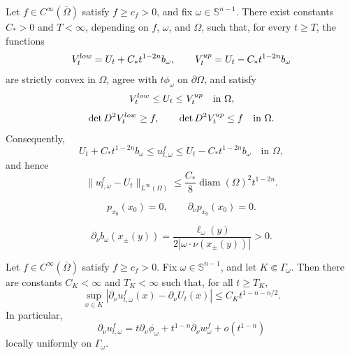 \documentclass[10pt,a4paper]{amsart}
\newcommand{\Sn}{\mathbb S^{n-1}}
\begin{document}
\begin{proposition}\label{prop:comparison-barriers}
Let \(f\in C^\infty(\overline\Omega)\) satisfy \(f\ge c_f>0\), and fix \(\omega\in\Sn\).  There exist constants \(C_*>0\) and \(T<\infty\), depending on \(f\), \(\omega\), and \(\Omega\), such that, for every \(t\ge T\), the functions
\begin{equation}\label{eq:lower-upper-barriers}
    V_t^{\rm low}
    =U_t+C_*t^{1-2n}b_\omega,
    \qquad
    V_t^{\rm up}
    =U_t-C_*t^{1-2n}b_\omega
\end{equation}
are strictly convex in \(\Omega\), agree with \(t\phi_\omega\) on \(\partial\Omega\), and satisfy
\begin{equation}\label{eq:barrier-order-around-U}
    V_t^{\rm low}\le U_t\le V_t^{\rm up}
    \quad\text{in }\Omega,
\end{equation}
\begin{equation}\label{eq:barrier-det-inequalities}
    \det D^2V_t^{\rm low}\ge f,
    \qquad
    \det D^2V_t^{\rm up}\le f
    \quad\text{in }\Omega .
\end{equation}
Consequently,
\begin{equation}\label{eq:global-C0-asymptotic}
    U_t+C_*t^{1-2n}b_\omega
    \le
    u_{t,\omega}^f
    \le
    U_t-C_*t^{1-2n}b_\omega
    \quad\text{in }\Omega,
\end{equation}
and hence
\begin{equation}\label{eq:global-C0-asymptotic-bound}
    \|u_{t,\omega}^f-U_t\|_{L^\infty(\Omega)}
    \le
    \frac{C_*}{8}\operatorname{diam}(\Omega)^2 t^{1-2n}.
\end{equation}
\end{proposition}

\begin{equation}\label{eq:p-x0-normal-zero}
    p_{x_0}(x_0)=0,
    \qquad
    \partial_\nu p_{x_0}(x_0)=0.
\end{equation}

\begin{equation}\label{eq:b-normal-step8}
    \partial_\nu b_\omega(x_\pm(y))
    =
    \frac{\ell_\omega(y)}{2|\omega\cdot\nu(x_\pm(y))|}
    >0.
\end{equation}

\begin{proposition}\label{prop:boundary-normal-from-C0}
Let \(f\in C^\infty(\overline\Omega)\) satisfy \(f\ge c_f>0\).  Fix \(\omega\in\Sn\), and let \(K\Subset\Gamma_\omega\).  Then there are constants \(C_K<\infty\) and \(T_K<\infty\) such that, for all \(t\ge T_K\),
\begin{equation}\label{eq:boundary-normal-rate-from-C0}
    \sup_{x\in K}
    \left|
        \partial_\nu u_{t,\omega}^f(x)
        -\partial_\nu U_t(x)
    \right|
    \le
    C_K t^{1-n-n/2}.
\end{equation}
In particular,
\begin{equation}\label{eq:boundary-normal-asymptotic-proved}
    \partial_\nu u_{t,\omega}^f
    =
    t\partial_\nu\phi_\omega
    +
    t^{1-n}\partial_\nu w_\omega^f
    +
    o(t^{1-n})
\end{equation}
locally uniformly on \(\Gamma_\omega\).
\end{proposition}
\end{document}
